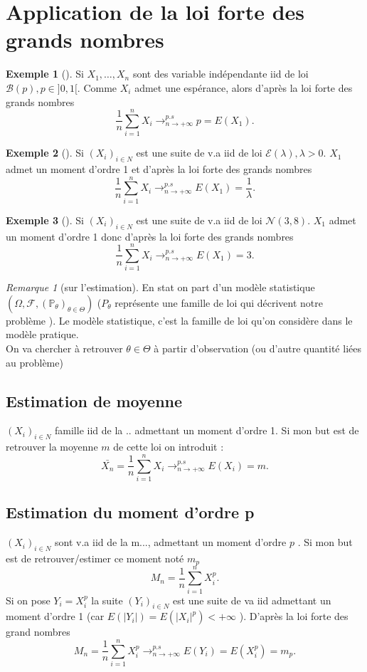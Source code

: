 \documentclass{article}
\theoremstyle{plain}%
\theoremstyle{definition}
\newtheorem{exmp}{Exemple}[section]
\theoremstyle{remark}
\newtheorem*{rem}{Remarque}
\begin{document}
\section{Application de la loi forte des grands nombres}
\begin{exmp}[]
    Si $ X_1, \dots, X_n $ sont des variable indépendante iid de loi $ \mathcal{B}(p), p \in ]0,1[ $. Comme $ X_i $ admet une espérance, alors d'après la loi forte des grands nombres 
    \[
        \frac{1}{n}\sum_{i=1}^{n}X_i \to^{p.s}_{n \to +\infty} p = E(X_1)
    .\]
\end{exmp}
\begin{exmp}[]
    Si $ (X_i)_{i \in N} $ est une suite de v.a iid de loi $ \mathcal{E}(\lambda ), \lambda > 0 $. $ X_1 $ admet un moment d'ordre 1 et d'après la loi forte des grands nombres 
    \[
        \frac{1}{n}\sum_{i=1}^{n}X_i \to^{p.s}_{n \to +\infty} E(X_1) = \frac{1}{\lambda }
    .\]
\end{exmp}
\begin{exmp}[]
    Si $ (X_i)_{i \in N} $ est une suite de v.a iid de loi $ \mathcal{N}(3,8)$. $ X_1 $ admet un moment d'ordre 1 donc d'après la loi forte des grands nombres 
    \[
        \frac{1}{n}\sum_{i=1}^{n}X_i \to^{p.s}_{n \to +\infty} E(X_1) = 3
    .\]
\end{exmp}

\begin{rem}[sur l'estimation]
    En stat on part d'un modèle statistique $ (\Omega , \mathcal{F}, (\mathbb{P}_\theta )_{\theta \in \Theta }) $ ($ P_\theta  $ représente une famille de loi qui décrivent notre problème ). Le modèle statistique, c'est la famille de loi qu'on considère dans le modèle pratique. \\
    On va chercher à retrouver $ \theta \in \Theta  $ à partir d'observation (ou d'autre quantité liées au problème)
\end{rem}

\subsection{Estimation de moyenne}

    $ (X_i)_{i \in N} $ famille iid de la .. admettant un moment d'ordre 1. Si mon but est de retrouver la moyenne $ m $ de cette loi on introduit : 
    \[
        \bar{X_n}= \frac{1}{n}\sum_{i=1}^{n}X_i \to^{p.s}_{n \to +\infty} E(X_i) = m
    .\]

\subsection{Estimation du moment d'ordre p}
$ (X_i)_{i \in N} $ sont v.a iid de la m..., admettant un moment d'ordre $ p $ . Si mon but est de retrouver/estimer ce moment noté $ m_p $ 
\[
    M_n = \frac{1}{n}\sum_{i=1}^{n}X_i^p
.\]
Si on pose $ Y_i = X_i^p $ la suite $ (Y_i)_{i \in N} $ est une suite de va iid admettant un moment d'ordre 1 (car $ E(\left| Y_i \right| ) = E(\left| X_i \right| ^p) < + \infty  $ ). D'après la loi forte des grand nombres 
\[
    M_n = \frac{1}{n}\sum_{i=1}^{n}X_i^p \to^{p.s}_{n \to +\infty} E(Y_i) = E(X_i^p)=m_p
.\]
\end{document}
